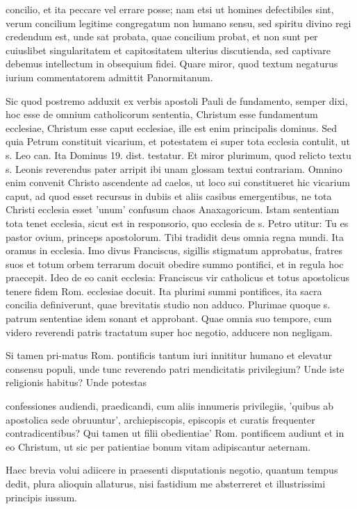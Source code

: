 concilio, et ita peccare vel errare posse; nam etsi ut homines defectibiles sint, verum concilium legitime congregatum non humano sensu, sed spiritu divino regi credendum est, unde sat probata, quae concilium probat, et non sunt per cuiuslibet singularitatem et capitositatem ulterius discutienda, sed captivare debemus intellectum in obsequium fidei. Quare miror, quod textum negaturus iurium commentatorem admittit Panormitanum.

Sic quod postremo adduxit ex verbis apostoli Pauli de fundamento, semper dixi, hoc esse de omnium catholicorum sententia, Christum esse fundamentum ecclesiae, Christum esse caput ecclesiae, ille est enim principalis dominus. Sed quia Petrum constituit vicarium, et potestatem ei super tota ecclesia contulit, ut s. Leo can. Ita Dominus 19. dist. testatur. Et miror plurimum, quod relicto textu s. Leonis reverendus pater arripit ibi unam glossam textui contrariam. Omnino enim convenit Christo ascendente ad caelos, ut loco sui constitueret hic vicarium caput, ad quod esset recursus in dubiis et aliis casibus emergentibus, ne tota Christi ecclesia esset 'unum' confusum chaos Anaxagoricum. Istam sententiam tota tenet ecclesia, sicut est in responsorio, quo ecclesia de s. Petro utitur: Tu es pastor ovium, princeps apostolorum. Tibi tradidit deus omnia regna mundi. Ita oramus in ecclesia. Imo divus Franciscus, sigillis stigmatum approbatus, fratres suos et totum orbem terrarum docuit obedire summo pontifici, et in regula hoc praecepit. Ideo de eo canit ecclesia: Franciscus vir catholicus et totus apostolicus tenere fidem Rom. ecclesiae docuit. Ita plurimi summi pontifices, ita sacra concilia definiverunt, quae brevitatis studio non adduco. Plurimae quoque s. patrum sententiae idem sonant et approbant. Quae omnia suo tempore, cum videro reverendi patris tractatum super hoc negotio, adducere non negligam.

Si tamen pri-\marginpar{\small[297]}matus Rom. pontificis tantum iuri innititur humano et elevatur consensu populi, unde tunc reverendo patri mendicitatis privilegium? Unde iste religionis habitus? Unde potestas

confessiones audiendi, praedicandi, cum aliis innumeris privilegiis, 'quibus ab apostolica sede obruuntur', archiepiscopis, episcopis et curatis frequenter contradicentibus? Qui tamen ut filii obedientiae' Rom. pontificem audiunt et in eo Christum, ut sic per patientiae bonum vitam adipiscantur aeternam.

Haec brevia volui adiicere in praesenti disputationis negotio, quantum tempus dedit, plura alioquin allaturus, nisi fastidium me absterreret et illustrissimi principis iussum.


